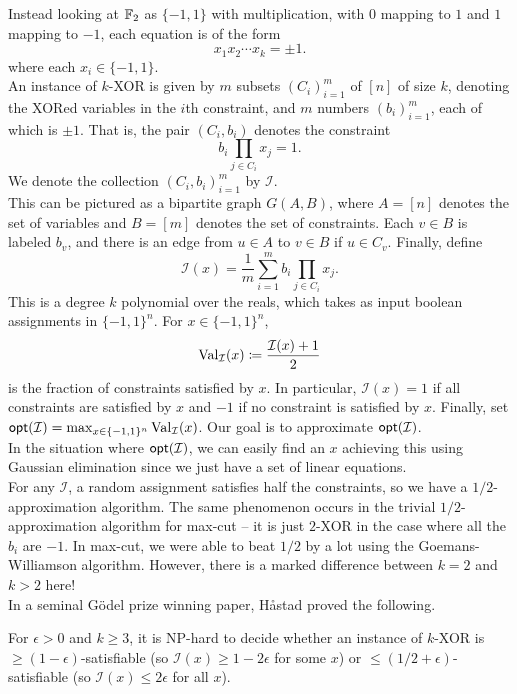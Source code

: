 	Instead looking at $\mathbb{F}_2$ as $\{-1,1\}$ with multiplication, with $0$ mapping to $1$ and $1$ mapping to $-1$, each equation is of the form
	\[ x_1 x_2 \cdots x_k = \pm 1. \]
	where each $x_i \in \{-1,1\}$.\\
	An instance of $k$-XOR is given by $m$ subsets $(C_i)_{i=1}^m$ of $[n]$ of size $k$, denoting the XORed variables in the $i$th constraint, and $m$ numbers $(b_i)_{i=1}^m$, each of which is $\pm 1$. That is, the pair $(C_i,b_i)$ denotes the constraint
	\[ b_i \prod_{j \in C_i} x_j = 1. \]
	We denote the collection $(C_i,b_i)_{i=1}^m$ by $\mathcal{I}$.\\
	This can be pictured as a bipartite graph $G(A,B)$, where $A = [n]$ denotes the set of variables and $B = [m]$ denotes the set of constraints. Each $v \in B$ is labeled $b_v$, and there is an edge from $u \in A$ to $v \in B$ if $u \in C_v$. Finally, define
	\[ \mathcal{I}(x) = \frac{1}{m} \sum_{i=1}^m b_i \prod_{j \in C_i} x_j. \]
	This is a degree $k$ polynomial over the reals, which takes as input boolean assignments in $\{-1,1\}^n$. For $x \in \{-1,1\}^n$,
	\[ \operatorname{Val}_\mathcal{I}(x) \coloneqq \frac{\mathcal{I}(x)+1}{2} \]
	is the fraction of constraints satisfied by $x$. In particular, $\mathcal{I}(x) = 1$ if all constraints are satisfied by $x$ and $-1$ if no constraint is satisfied by $x$. Finally, set $\mathsf{opt}(\mathcal{I}) = \max_{x \in \{-1,1\}^n} \operatorname{Val}_\mathcal{I}(x)$. Our goal is to approximate $\mathsf{opt}(\mathcal{I})$.\\
	In the situation where $\mathsf{opt}(\mathcal{I})$, we can easily find an $x$ achieving this using Gaussian elimination since we just have a set of linear equations.\\
	For any $\mathcal{I}$, a random assignment satisfies half the constraints, so we have a $1/2$-approximation algorithm. The same phenomenon occurs in the trivial $1/2$-approximation algorithm for max-cut -- it is just $2$-XOR in the case where all the $b_i$ are $-1$. In max-cut, we were able to beat $1/2$ by a lot using the Goemans-Williamson algorithm. However, there is a marked difference between $k=2$ and $k>2$ here!\\
	In a seminal G\"{o}del prize winning paper, H\r{a}stad \cite{hastad-appx-3sat} proved the following.

	\begin{ftheo}[H\r{a}stad]
		For $\epsilon > 0$ and $k \ge 3$, it is \textsf{NP}-hard to decide whether an instance of $k$-XOR is $\ge (1-\epsilon)$-satisfiable (so $\mathcal{I}(x) \ge 1-2\epsilon$ for some $x$) or $\le (1/2 + \epsilon)$-satisfiable (so $\mathcal{I}(x) \le 2\epsilon$ for all $x$).
	\end{ftheo}

